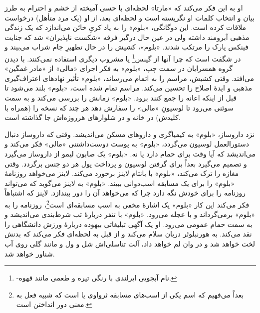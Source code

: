 \documentclass[12pt]{book}
\newcommand{\noun}[1]{«{#1}»}
\begin{document}
    او به این فکر می‌کند که \noun{مارتا} لحظه‌ای با حسی آمیخته از خشم و احترام به طرز بیان و انتخاب کلمات او نگریسته است و لحظه‌ای بعد، از او (یک مرد متأهل) درخواست ملاقات کرده است. این دوگانگی، \noun{بلوم} را به یاد کریِ خائن می‌اندازد که یک زندگی مذهبی آبرومند داشته ولی در عین حال درگیر فرقه «شکست ناپذیران» شد که جنایت فینکس پارک را مرتکب شدند. \noun{بلوم}، کشیش را در حال تطهیرِ جام شراب می‌بیند و در شگفت است که چرا آنها از گینس\footnote{-نام آبجویی ایرلندی با رنگی تیره و طعمی مانند قهوه.} یا مشروب دیگری استفاده نمی‌کنند. با دیدن گروه همسرایان در سمت چپ، \noun{بلوم} به فکر اجرای \noun{مالی} از «مادر غمگین» می‌افتد. وقتی کشیش، مراسم را به اتمام می‌رساند، \noun{بلوم} تأثیر نهادهای اعتراف‌گیری مذهبی و ایدۀ اصلاح را تحسین می‌کند. مراسم تمام شده است، \noun{بلوم} بلند می‌شود تا قبل از اینکه اعانه را جمع کنند برود. \noun{بلوم} زمانش را بررسی می‌کند و به سمت سوئنی می‌رود تا لوسیونِ \noun{مالی} را سفارش دهد هر چند که نسخه را (همراه با کلیدش) در خانه و در شلوارهای هرروزه‌اش جا گذاشته است.

    نزد داروساز، \noun{بلوم} به کیمیاگری و داروهای مسکن می‌اندیشد. وقتی که داروساز دنبال دستورالعمل لوسیون می‌گردد، \noun{بلوم} به پوست دوست‌داشتنی \noun{مالی} فکر می‌کند و می‌اندیشد که آیا وقت برای حمام دارد یا نه. \noun{بلوم} یک صابون لیمو از داروساز می‌گیرد و تصمیم می‌گیرد بعداً برای گرفتن لوسیون و پرداخت پول هر دو جنس برگردد. وقتی مغازه را ترک می‌کند، \noun{بلوم} با بانتام لاینز برخورد می‌کند. لاینز می‌خواهد روزنامۀ \noun{بلوم} را برای یک مسابقه اسب‌دوانی ببیند. \noun{بلوم} به لاینز می‌گوید که می‌تواند روزنامه را برای خودش نگه دارد چرا که می‌خواهد آن را دور بیندازد. لاینز که اشتباهاً فکر می‌کند این کار \noun{بلوم} یک اشارۀ مخفی به اسب مسابقه‌ای است\footnote{بعداً می‌فهیم که اسم یکی از اسب‌های مسابقه ثرواوی یا  است که شبیه فعل  به معنی دور انداختن است.}، روزنامه را به \noun{بلوم} برمی‌گرداند و با عجله می‌رود. \noun{بلوم} با تنفر دربارۀ تب شرط‌بندی می‌اندیشد و به سمت حمام عمومی می‌رود. او یک آگهی تبلیغاتی بیهوده دربارۀ ورزش دانشگاهی را نقد می‌کند. به هورنبلوئر دربان سلام می‌کند و از قبل به لحظه‌ای فکر می‌کند که بدنش لخت خواهد شد و در وان لم خواهد داد، آلت تناسلی‌اش شل و ول و مانند گلی روی آب شناور خواهد شد.
\end{document}
